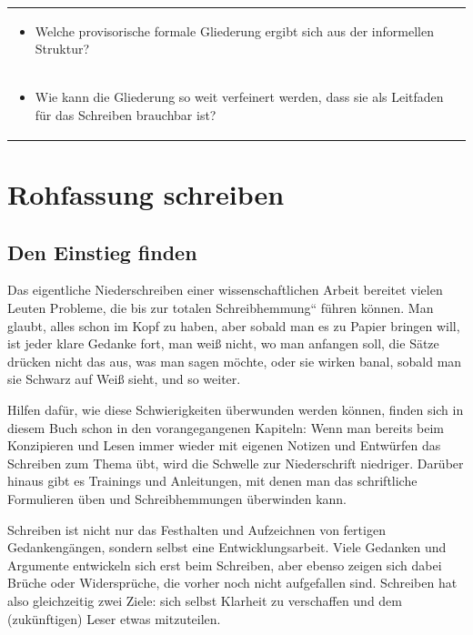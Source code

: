 \documentclass[]{book}
\providecommand{\tightlist}{%
  \setlength{\itemsep}{0pt}\setlength{\parskip}{0pt}}
\theoremstyle{definition}
\theoremstyle{definition}
\theoremstyle{definition}
\theoremstyle{remark}
\begin{document}
\begin{longtable}[]{@{}l@{}}
\begin{minipage}[t]{0.97\columnwidth}
\begin{itemize}
\tightlist
\item
  Welche provisorische formale Gliederung ergibt sich aus der
  informellen Struktur? \vspace{-6mm}
\end{itemize}\strut
\end{minipage}\tabularnewline
\begin{minipage}[t]{0.97\columnwidth}\raggedright\strut
\begin{itemize}
\tightlist
\item
  Wie kann die Gliederung so weit verfeinert werden, dass sie als
  Leitfaden für das Schreiben brauchbar ist?
\end{itemize}\strut
\end{minipage}\tabularnewline
\bottomrule
\end{longtable}

\section{Rohfassung schreiben}\label{rohfassung-schreiben}

\subsection{Den Einstieg finden}\label{den-einstieg-finden}

Das eigentliche Niederschreiben einer wissenschaftlichen Arbeit bereitet
vielen Leuten Probleme, die bis zur totalen Schreibhemmung`` führen
können. Man glaubt, alles schon im Kopf zu haben, aber sobald man es zu
Papier bringen will, ist jeder klare Gedanke fort, man weiß nicht, wo
man anfangen soll, die Sätze drücken nicht das aus, was man sagen
möchte, oder sie wirken banal, sobald man sie Schwarz auf Weiß sieht,
und so weiter.

Hilfen dafür, wie diese Schwierigkeiten überwunden werden können, finden
sich in diesem Buch schon in den vorangegangenen Kapiteln: Wenn man
bereits beim Konzipieren und Lesen immer wieder mit eigenen Notizen und
Entwürfen das Schreiben zum Thema übt, wird die Schwelle zur
Niederschrift niedriger. Darüber hinaus gibt es Trainings und
Anleitungen, mit denen man das schriftliche Formulieren üben und
Schreibhemmungen überwinden kann.

Schreiben ist nicht nur das Festhalten und Aufzeichnen von fertigen
Gedankengängen, sondern selbst eine Entwicklungsarbeit. Viele Gedanken
und Argumente entwickeln sich erst beim Schreiben, aber ebenso zeigen
sich dabei Brüche oder Widersprüche, die vorher noch nicht aufgefallen
sind. Schreiben hat also gleichzeitig zwei Ziele: sich selbst Klarheit
zu verschaffen und dem (zukünftigen) Leser etwas mitzuteilen.
\end{document}
